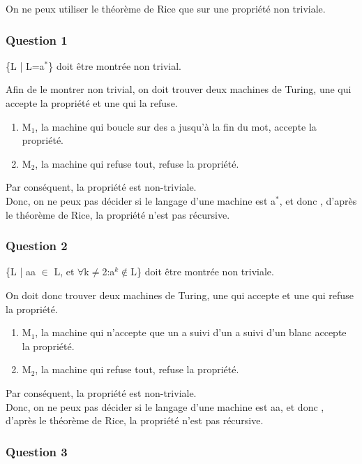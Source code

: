 On ne peux utiliser le th\'eor\`eme de
Rice que sur une propri\'et\'e
non triviale.

\subsubsection{Question 1}

\{L | L=a$^*$\} doit \^etre montr\'ee
non trivial.

Afin de le montrer non trivial, on doit
trouver deux machines de Turing,
une qui accepte la propri\'et\'e et une
qui la refuse.
\begin{enumerate}
  \item M$_1$, la machine qui boucle sur
  des a jusqu'\`a la fin du mot,
  accepte la propri\'et\'e.
  \item M$_2$, la machine qui refuse tout,
  refuse la propri\'et\'e.
\end{enumerate}

Par cons\'equent, la propri\'et\'e est
non-triviale.\\
Donc, on ne peux pas d\'ecider si le
langage d'une machine est a$^*$, et donc
, d'apr\`es le th\'eor\`eme de Rice,
la propri\'et\'e n'est pas r\'ecursive.

\subsubsection{Question 2}

\{L | aa $\in$ L, et
$\forall$k$\neq$2:a$^k\not\in$L\} doit
\^etre montr\'ee non triviale.

On doit donc trouver deux machines de
Turing, une qui accepte et une qui refuse
la propri\'et\'e.
\begin{enumerate}
  \item M$_1$, la machine qui n'accepte
  que un a suivi d'un a suivi d'un blanc
  accepte la propri\'et\'e.
  \item M$_2$, la machine qui refuse tout,
  refuse la propri\'et\'e.
\end{enumerate}

Par cons\'equent, la propri\'et\'e est
non-triviale.\\
Donc, on ne peux pas d\'ecider si le
langage d'une machine est aa, et donc
, d'apr\`es le th\'eor\`eme de Rice,
la propri\'et\'e n'est pas r\'ecursive.

\subsubsection{Question 3}

